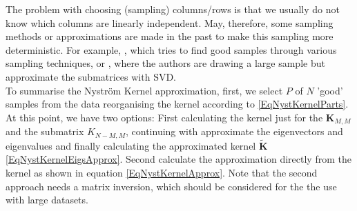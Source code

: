 The problem with choosing (sampling) columns/rows is that we usually do not know which columns are linearly independent.
May, therefore, some sampling methods or approximations are made in the past to make this sampling more deterministic.
For example, \cite{Kumar.2012}, which tries to find good samples through various sampling techniques, or \cite{Li.2015}, where the authors are drawing a large sample but approximate the submatrices with \ac{SVD}.\\
To summarise the Nyström Kernel approximation, first, we select $P$ of $N$ 'good' samples from the data reorganising the kernel according to \eqref{EqNystKernelParts}.
At this point, we have two options:
First calculating the kernel just for the $\mathbf{K}_{M, M}$ and the submatrix ${K}_{N-M, M}$, continuing with approximate the eigenvectors and eigenvalues and finally calculating the approximated kernel $\tilde{\mathbf{K}}$ \eqref{EqNystKernelEigsApprox}.
Second calculate the approximation directly from the kernel as shown in equation \eqref{EqNystKernelApprox}. Note that the second approach needs a matrix inversion, which should be considered for the the use with large datasets.
